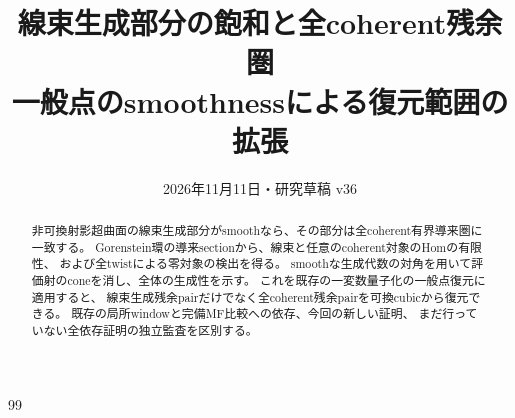 \documentclass[a4paper,11pt]{ltjsarticle}
\title{線束生成部分の飽和と全coherent残余圏\\\large 一般点のsmoothnessによる復元範囲の拡張}
\author{}\date{2026年11月11日・研究草稿 v36}
\theoremstyle{definition}\newtheorem{example}[theorem]{例}
\theoremstyle{remark}\newtheorem{remark}[theorem]{注意}\renewcommand{\proofname}{証明}
\begin{document}
\maketitle
\begin{abstract}
非可換射影超曲面の線束生成部分がsmoothなら、その部分は全coherent有界導来圏に一致する。
Gorenstein環の導来sectionから、線束と任意のcoherent対象のHomの有限性、
および全twistによる零対象の検出を得る。
smoothな生成代数の対角を用いて評価射のconeを消し、全体の生成性を示す。
これを既存の一変数量子化の一般点復元に適用すると、
線束生成残余pairだけでなく全coherent残余pairを可換cubicから復元できる。
既存の局所windowと完備MF比較への依存、今回の新しい証明、
まだ行っていない全依存証明の独立監査を区別する。
\end{abstract}

\begin{thebibliography}{99}

\end{thebibliography}
\end{document}

